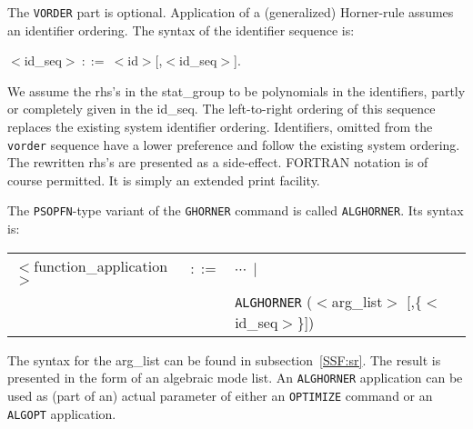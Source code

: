 The {\tt VORDER} part is optional. Application of 
a (generalized) Horner-rule assumes an identifier ordering. The syntax
of the identifier sequence is: 

\hspace{1cm} $<$id\_seq$>~::=~<$id$>$[,$<$id\_seq$>$].

We assume the rhs's in the stat\_group to be polynomials in
the identifiers, partly or completely given in the id\_seq. The 
left-to-right ordering of this sequence replaces the existing system 
identifier ordering. Identifiers, omitted from the {\tt vorder} sequence
have a lower preference and follow the existing system ordering. The
rewritten rhs's are presented as a side-effect. FORTRAN notation is of
course permitted. It is simply an extended print facility.

The {\tt PSOPFN}-type variant of the {\tt GHORNER} command is 
called {\tt ALGHORNER}. Its syntax is:

\begin{center}
\begin{tabular}{lcl}
$<$function\_application$>$ & $::=$ & $\cdots~\mid$\\
 & & {\tt ALGHORNER} ($<$arg\_list$>$ [,\{$<$id\_seq$>$\}]) \\
\end{tabular}
\end{center}

The syntax for the arg\_list can be found in subsection~\ref{SSF:sr}.
The result is presented in the form of an algebraic mode list.
An {\tt ALGHORNER} application can be used as (part of an) actual parameter 
of either an {\tt OPTIMIZE} command or an {\tt ALGOPT} application.

\example\label{ex:4.1.3}

